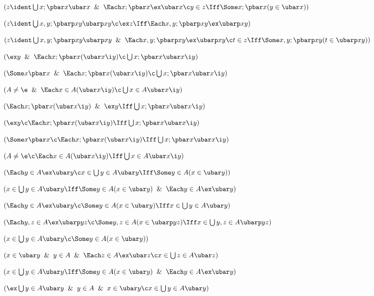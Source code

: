  $(z \ident \bigcup x; \pbar x \ubar x \And \Each x ; \pbar x \ex \ubar x\c
y \in z \Iff \Some x; \pbar x (y \in \ubar x))$

 $(z \ident \bigcup x,y; \pbarp xy \ubarp xy \c
\ex z \Iff \Each x,y ; \pbarp xy \ex \ubarp xy)$

 $(z \ident \bigcup x,y; \pbarp xy \ubarp xy \And \Each x,y;\pbarp xy \ex \ubarp xy \c
t \in z \Iff \Some x,y; \pbarp xy (t \in \ubarp xy))$

$(\ex y \And \Each x;\pbar x (\ubar x \i y)
\c \bigcup x;\pbar x \ubar x \i y)$

$(\Some x\pbar x \And \Each x;\pbar x (\ubar x \i y)
	\c \bigcup x;\pbar x \ubar x \i y)$

$(A \ne \e \And \Each x \in A (\ubar x \i y)
	\c \bigcup x \in A \ubar x \i y)$

 $(\Each x;\pbar x(\ubar x \i y) \And \ex y
	\Iff \bigcup x;\pbar x \ubar x \i y )$

 $(\ex y \c \Each x;\pbar x(\ubar x \i y)
	\Iff \bigcup x;\pbar x \ubar x \i y)$

 $(\Some x \pbar x \c \Each x;\pbar x(\ubar x \i y)
	\Iff \bigcup x;\pbar x \ubar x \i y)$

$(A \ne \e \c \Each x \in A (\ubar x \i y)
	\Iff \bigcup x \in A \ubar x \i y)$


 $(\Each y\in A\ex\ubar y \c x \in 
\bigcup y \in A\ubar y \Iff \Some y \in A (x \in \ubar y))$

 $(x \in \bigcup y \in A\ubar y \Iff 
	\Some y \in A (x \in \ubar y) \And \Each y\in A\ex\ubar y)$

 $(\Each y\in A\ex\ubar y \c  
\Some y \in A (x \in \ubar y) \Iff 
x \in \bigcup y \in A\ubar y )$

 $(\Each y,z \in A\ex\ubarp yz \c  
\Some y,z \in A (x \in \ubarp yz) \Iff 
x \in \bigcup y,z \in A\ubarp yz )$

 $(x \in \bigcup y \in A \ubar y \c \Some y \in A(x \in \ubar y))$

 $(x \in \ubar y \And y \in A \And \Each z \in A \ex\ubar z
\c x \in \bigcup z\in A \ubar z)$


 $(x \in \bigcup y \in A \ubar y \Iff
\Some y \in A(x \in \ubar y) \And \Each y \in A \ex\ubar y)$ 

 $(\ex \bigcup y \in A \ubar  y \And y \in A \And x \in \ubar y \c
x \in \bigcup y \in A \ubar y )$

